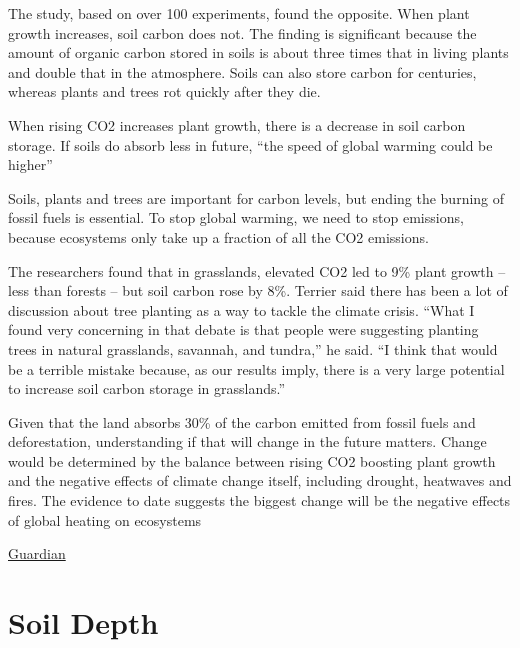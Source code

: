 \documentclass[
]{book}
\begin{document}
The study, based on over 100 experiments, found the opposite. When plant growth increases, soil carbon does not. The finding is significant because the amount of organic carbon stored in soils is about three times that in living plants and double that in the atmosphere. Soils can also store carbon for centuries, whereas plants and trees rot quickly after they die.

When rising CO2 increases plant growth, there is a decrease in soil carbon storage.
If soils do absorb less in future, ``the speed of global warming could be higher''

Soils, plants and trees are important for carbon levels,
but ending the burning of fossil fuels is essential.
To stop global warming, we need to stop emissions,
because ecosystems only take up a fraction of all the CO2 emissions.

The researchers found that in grasslands, elevated CO2 led to 9\% plant growth -- less than forests -- but soil carbon rose by 8\%. Terrier said there has been a lot of discussion about tree planting as a way to tackle the climate crisis. ``What I found very concerning in that debate is that people were suggesting planting trees in natural grasslands, savannah, and tundra,'' he said. ``I think that would be a terrible mistake because, as our results imply, there is a very large potential to increase soil carbon storage in grasslands.''

Given that the land absorbs 30\% of the carbon emitted from fossil fuels and deforestation, understanding if that will change in the future matters.
Change would be determined by the balance between rising CO2 boosting plant growth and the negative effects of climate change itself, including drought, heatwaves and fires. The evidence to date suggests the biggest change will be the negative effects of global heating on ecosystems

\href{https://www.theguardian.com/environment/2021/mar/24/soils-ability-to-absorb-carbon-emissions-may-be-overestimated-study}{Guardian}

\hypertarget{soil-depth}{%
\section{Soil Depth}\label{soil-depth}}
\end{document}
